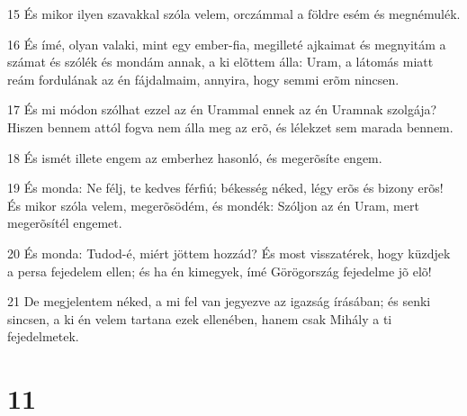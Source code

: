 \par 15 És mikor ilyen szavakkal szóla velem, orczámmal a földre esém és megnémulék.
\par 16 És ímé, olyan valaki, mint egy ember-fia, megilleté ajkaimat és megnyitám a számat és szólék és mondám annak, a ki elõttem  álla: Uram, a látomás miatt reám fordulának az én fájdalmaim, annyira, hogy semmi erõm nincsen.
\par 17 És mi módon szólhat ezzel az én Urammal ennek az én Uramnak szolgája? Hiszen bennem attól fogva nem álla meg az erõ, és lélekzet sem marada bennem.
\par 18 És ismét illete engem az emberhez hasonló, és megerõsíte engem.
\par 19 És monda: Ne félj, te kedves férfiú; békesség néked, légy erõs és bizony erõs! És mikor szóla velem, megerõsödém, és mondék: Szóljon az én Uram, mert megerõsítél engemet.
\par 20 És monda: Tudod-é, miért jöttem hozzád? És most visszatérek, hogy küzdjek a persa fejedelem ellen; és ha én kimegyek,  ímé Görögország fejedelme jõ elõ!
\par 21 De megjelentem néked, a mi fel van jegyezve az igazság írásában; és senki sincsen, a ki én velem tartana ezek ellenében, hanem csak Mihály a ti fejedelmetek.

\chapter{11}

